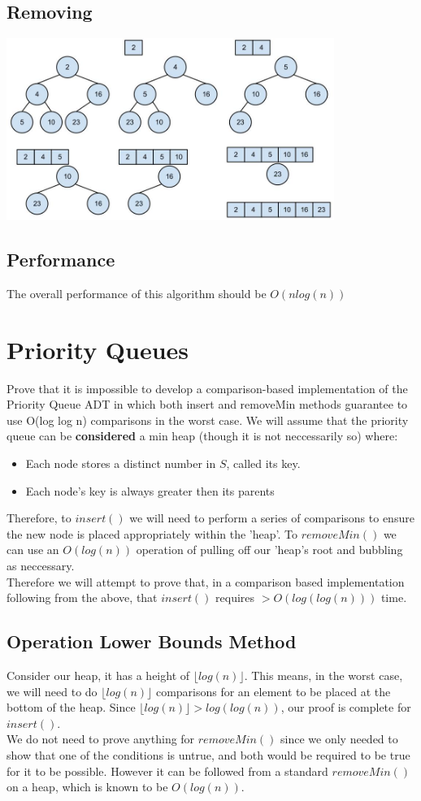 \documentclass[12pt]{article}
\begin{document}
\subsection{Removing}
\begin{center}
\includegraphics[width=0.8\textwidth]{figures/heapsort2.jpg}
\end{center}
\subsection{Performance}
The overall performance of this algorithm should be $ O(n log(n) )$

\section{Priority Queues}
Prove that it is impossible to develop a comparison-based implementation of the Priority Queue ADT in which both insert and removeMin methods guarantee to use O(log log n) comparisons in the worst case.
We will assume that the priority queue can be {\bf considered} a min heap (though it is not neccessarily so) where:
\begin{itemize}
	\item Each node stores a distinct number in $S$, called its key.
	\item Each node's key is always greater then its parents
\end{itemize}
Therefore, to $insert()$ we will need to perform a series of comparisons to ensure the new node is placed appropriately within the 'heap'. %
To $removeMin()$ we can use an $O(log(n))$ operation of pulling off our 'heap's root and bubbling as neccessary. \\
Therefore we will attempt to prove that, in a comparison based implementation following from the above, that $insert()$ requires $>O(log(log(n)))$ time.
\subsection{Operation Lower Bounds Method}
Consider our heap, it has a height of $\lfloor log(n) \rfloor$. This means, in the worst case, we will need to do $\lfloor log(n) \rfloor$ comparisons for an element to be placed at the bottom of the heap. Since $\lfloor log(n) \rfloor > log(log(n))$, our proof is complete for $insert()$. \\
We do not need to prove anything for $removeMin()$ since we only needed to show that one of the conditions is untrue, and both would be required to be true for it to be possible. However it can be followed from a standard $removeMin()$ on a heap, which is known to be $O(log(n))$.
\end{document}
